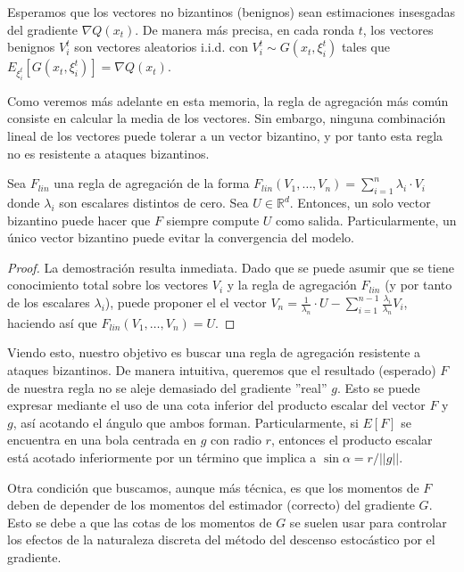 Esperamos que los vectores no bizantinos (benignos) sean estimaciones insesgadas del gradiente $\nabla Q(x_t)$.  De manera más precisa, en cada ronda $t$, los vectores benignos $V_i^t$ son vectores aleatorios \ac{i.i.d.} con $V_i^t \sim G(x_t, \xi_i^t)$ tales que $E_{\xi_i^t}[G(x_t, \xi_i^t)] = \nabla Q(x_t)$. 

Como veremos más adelante en esta memoria, la regla de agregación más común consiste en calcular la media de los vectores. Sin embargo, ninguna combinación lineal de los vectores puede tolerar a un vector bizantino, y por tanto esta regla no es resistente a ataques bizantinos.

\begin{lemma}
	Sea $F_{lin}$ una regla de agregación de la forma $F_{lin}(V_1, \ldots, V_n)=\sum_{i=1}^n \lambda_i \cdot V_i$ donde $\lambda_i$ son escalares distintos de cero. Sea $U \in \mathbb{R}^d$. Entonces, un solo vector bizantino puede hacer que $F$ siempre compute $U$ como salida. Particularmente, un único vector bizantino puede evitar la convergencia del modelo. 
\end{lemma}

\begin{proof}
	La demostración resulta inmediata. Dado que se puede asumir que se tiene conocimiento total sobre los vectores $V_i$ y la regla de agregación $F_{lin}$ (y por tanto de los escalares $\lambda_i$), puede proponer el el vector $V_n = \frac{1}{\lambda_n}\cdot U - \sum_{i=1}^{n-1}\frac{\lambda_i}{\lambda_n}V_i$, haciendo así que $F_{lin}(V_1, \ldots, V_n)=U$.
\end{proof}

Viendo esto, nuestro objetivo es buscar una regla de agregación resistente a ataques bizantinos. De manera intuitiva, queremos que el resultado (esperado) $F$  de nuestra regla no se aleje demasiado del gradiente ''real'' $g$. Esto se puede expresar mediante el uso de una cota inferior del producto escalar del vector $F$ y $g$, así acotando el ángulo que ambos forman. Particularmente, si $E[F]$ se encuentra en una bola centrada en $g$ con radio $r$, entonces el producto escalar está acotado inferiormente por un término que implica a $\sin \alpha = r / ||g||$.

Otra condición que buscamos, aunque más técnica, es que los momentos de $F$ deben de depender de los momentos del estimador (correcto) del gradiente $G$. Esto se debe a que las cotas de los momentos de $G$ se suelen usar para controlar los efectos de la naturaleza discreta del método del descenso estocástico por el gradiente.

